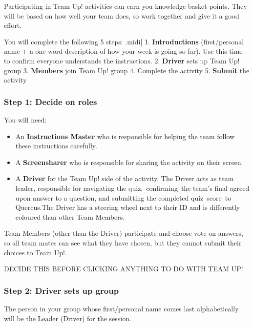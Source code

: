 \documentclass[
  openany]{book}
\begin{document}
Participating in Team Up! activities can earn you knowledge basket points. They will be based on how well your team does, so work together and give it a good effort.

You will complete the following 5 steps:
.midi{[}
1. \textbf{Introductions} (first/personal name + a one-word description of how your week is going so far). Use this time to confirm everyone understands the instructions.
2. \textbf{Driver} sets up Team Up! group
3. \textbf{Members} join Team Up! group
4. Complete the activity
5. \textbf{Submit} the activity

\hypertarget{step-1-decide-on-roles}{%
\subsubsection{Step 1: Decide on roles}\label{step-1-decide-on-roles}}

You will need:

\begin{itemize}
\item
  An \textbf{Instructions Master} who is responsible for helping the team follow these instructions carefully.\\
\item
  A \textbf{Screensharer} who is responsible for sharing the activity on their screen.
\item
  A \textbf{Driver} for the Team Up! side of the activity. The Driver acts as team leader, responsible for navigating the quiz,~confirming~the team's final agreed upon answer to a question, and submitting the completed quiz~score~to Quercus.The Driver has a steering wheel next to their ID and is differently coloured than other Team Members.
\end{itemize}

Team Members (other than the Driver) participate and choose vote on answers, so all team mates can see what they have chosen, but they cannot submit their choices to Team Up!.

DECIDE THIS BEFORE CLICKING ANYTHING TO DO WITH TEAM UP!

\hypertarget{step-2-driver-sets-up-group}{%
\subsubsection{Step 2: Driver sets up group}\label{step-2-driver-sets-up-group}}

The person in your group whose first/personal name comes last alphabetically will be the Leader (Driver) for the session.
\end{document}
